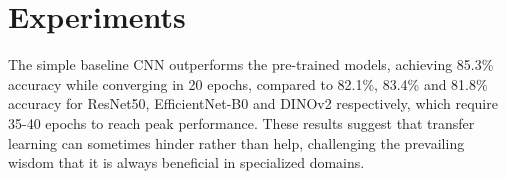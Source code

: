 \section{Experiments}
\label{sec:experiments}
The simple baseline CNN outperforms the pre-trained models, achieving 85.3\% accuracy while converging in 20 epochs, compared to 82.1\%, 83.4\% and 81.8\% accuracy for ResNet50, EfficientNet-B0 and DINOv2 respectively, which require 35-40 epochs to reach peak performance. These results suggest that transfer learning can sometimes hinder rather than help, challenging the prevailing wisdom that it is always beneficial in specialized domains.